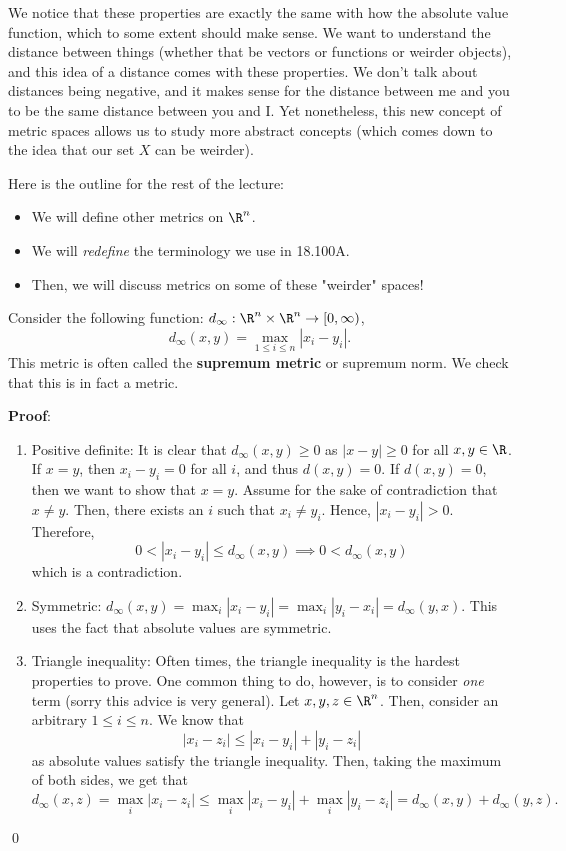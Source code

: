 We notice that these properties are exactly the same with how the absolute value function, which to some extent should make sense. We want to understand the distance between things (whether that be vectors or functions or weirder objects), and this idea of a distance comes with these properties. We don't talk about distances being negative, and it makes sense for the distance between me and you to be the same distance between you and I. Yet nonetheless, this new concept of metric spaces allows us to study more abstract concepts (which comes down to the idea that our set $X$ can be weirder).

Here is the outline for the rest of the lecture:
\begin{itemize}
    \item We will define other metrics on $\R^n$.
    \item We will \textit{redefine} the terminology we use in 18.100A.
    \item Then, we will discuss metrics on some of these "weirder" spaces!
\end{itemize}

\begin{example}
Consider the following function: $d_\infty:\R^n\times \R^n \to [0,\infty)$, 
\[
d_\infty(x,y) = \max_{1\leq i\leq n} |x_i-y_i|.
\]
This metric is often called the \textbf{supremum metric} or supremum norm. We check that this is in fact a metric.
\end{example}
\textbf{Proof}:
\begin{enumerate}
    \item Positive definite: It is clear that $d_\infty(x,y) \geq 0$ as $|x-y| \geq 0$ for all $x,y\in \R$. If $x=y$, then $x_i - y_i = 0$ for all $i$, and thus $d(x,y) = 0$. If $d(x,y) = 0$, then we want to show that $x = y$. Assume for the sake of contradiction that $x \neq y$. Then, there exists an $i$ such that $x_i \neq y_i$. Hence, $|x_i - y_i| >0$. Therefore, 
    \[
    0 < |x_i-y_i|\leq d_\infty(x,y) \implies 0< d_\infty(x,y) 
    \]
    which is a contradiction.
    \item Symmetric: $d_\infty (x,y) = \max_i |x_i - y_i| = \max_i |y_i - x_i| = d_\infty(y,x)$. This uses the fact that absolute values are symmetric.
    \item Triangle inequality: Often times, the triangle inequality is the hardest properties to prove. One common thing to do, however, is to consider \textit{one} term (sorry this advice is very general). Let $x,y,z\in \R^n$. Then, consider an arbitrary $1\leq i \leq n$. We know that 
    \[
    |x_i - z_i| \leq |x_i - y_i| + |y_i -z_i|
    \]
    as absolute values satisfy the triangle inequality. Then, taking the maximum of both sides, we get that 
    \[
    d_\infty(x,z) = \max_i |x_i - z_i| \leq \max_i |x_i-y_i| + \max_i |y_i - z_i| = d_\infty(x,y) + d_\infty (y,z).
    \]
\end{enumerate}
\qed 

